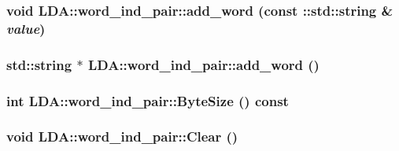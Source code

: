 \label{class_l_d_a_1_1word__ind__pair_a25b0e19ff1b7e74131b6b19a7ddd9e39}
\hypertarget{class_l_d_a_1_1word__ind__pair_a27765c940e36efd7836c879ff99febbb}{
\subsubsection[{add\_\-word}]{\setlength{\rightskip}{0pt plus 5cm}void LDA::word\_\-ind\_\-pair::add\_\-word (const ::std::string \& {\em value})}}
\label{class_l_d_a_1_1word__ind__pair_a27765c940e36efd7836c879ff99febbb}
\hypertarget{class_l_d_a_1_1word__ind__pair_a7238422ac94bab72ddcdd25bbd4dd84a}{
\subsubsection[{add\_\-word}]{\setlength{\rightskip}{0pt plus 5cm}std::string $\ast$ LDA::word\_\-ind\_\-pair::add\_\-word ()}}
\label{class_l_d_a_1_1word__ind__pair_a7238422ac94bab72ddcdd25bbd4dd84a}
\hypertarget{class_l_d_a_1_1word__ind__pair_a21383c22632c3f0cdc5d346bb1200392}{
\subsubsection[{ByteSize}]{\setlength{\rightskip}{0pt plus 5cm}int LDA::word\_\-ind\_\-pair::ByteSize () const}}
\label{class_l_d_a_1_1word__ind__pair_a21383c22632c3f0cdc5d346bb1200392}
\hypertarget{class_l_d_a_1_1word__ind__pair_a873e5641e708a95ab5f96c91b8c45e2e}{
\subsubsection[{Clear}]{\setlength{\rightskip}{0pt plus 5cm}void LDA::word\_\-ind\_\-pair::Clear ()}}
\label{class_l_d_a_1_1word__ind__pair_a873e5641e708a95ab5f96c91b8c45e2e}
